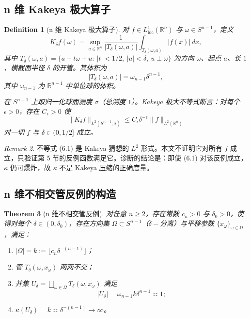 \documentclass[11pt,a4paper]{article}
\newtheorem{theorem}{Theorem}[section]
\newtheorem{definition}[theorem]{Definition}
\theoremstyle{remark}
\newtheorem{remark}[theorem]{Remark}
\begin{document}
		\subsection{n 维 Kakeya 极大算子}
		\begin{definition}[n 维 Kakeya 极大算子]
		对 $f\in L^1_{\mathrm{loc}}(\mathbb R^n)$ 与 $\omega\in S^{n-1}$，定义
		\[
		K_\delta f(\omega)=\sup_{a\in\mathbb R^n}\frac{1}{|T_\delta(\omega,a)|}\int_{T_\delta(\omega,a)}|f(x)|\,dx,
		\]
		其中 $T_\delta(\omega,a)=\{a+t\omega+u:\ |t|<1/2,\ |u|<\delta,\ u\perp\omega\}$ 为方向 $\omega$、起点 $a$、长 $1$、横截面半径 $\delta$ 的开管。其体积为
		\[
		|T_\delta(\omega,a)|=\omega_{n-1}\delta^{n-1},
		\]
		其中 $\omega_{n-1}$ 为 $\mathbb R^{n-1}$ 中单位球的体积。
		
		在 $S^{n-1}$ 上取归一化球面测度 $\sigma$（总测度 $1$）。Kakeya 极大不等式断言：对每个 $\epsilon>0$，存在 $C_\epsilon>0$ 使
		\[
		\|K_\delta f\|_{L^2(S^{n-1},\sigma)}\le C_\epsilon\delta^{-\epsilon}\|f\|_{L^2(\mathbb R^n)}
		\tag{6.1}
		\]
		对一切 $f$ 与 $\delta\in(0,1/2]$ 成立。
		\end{definition}
		
		\begin{remark}
		不等式 (6.1) 是 Kakeya 猜想的 $L^2$ 形式。本文不证明它对所有 $f$ 成立，只验证第 5 节的反例函数满足它。诊断的结论是：即使 (6.1) 对该反例成立，$\kappa$ 仍可爆炸，故 $\kappa$ 不是 Kakeya 压缩的正确度量。
		\end{remark}
		
		\subsection{n 维不相交管反例的构造}
		\begin{theorem}[n 维不相交管反例]
		对任意 $n\ge2$，存在常数 $c_n>0$ 与 $\delta_0>0$，使得对每个 $\delta\in(0,\delta_0)$，存在方向集 $\Omega\subset S^{n-1}$（$\delta-$分离）与平移参数 $\{x_\omega\}_{\omega\in\Omega}$，满足：
		\begin{enumerate}
			\item[(i)] $|\Omega|=k:=\lfloor c_n\delta^{-(n-1)}\rfloor$；
			\item[(ii)] 管 $T_\delta(\omega,x_\omega)$ 两两不交；
			\item[(iii)] 并集 $U_\delta=\bigsqcup_{\omega\in\Omega}T_\delta(\omega,x_\omega)$ 满足
			\[
			|U_\delta|=\omega_{n-1}k\delta^{n-1}\asymp1;
			\]
			\item[(iv)] $\kappa(U_\delta)=k\asymp\delta^{-(n-1)}\to\infty$。
		\end{enumerate}
		\end{theorem}
		
\end{document}
